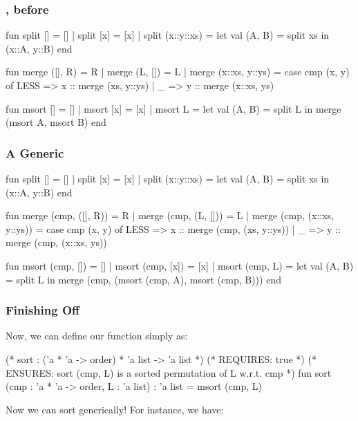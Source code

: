 \documentclass[aspectratio=169]{beamer}
\begin{document}
\begin{frame}[fragile]
  \frametitle{, before}
  {\tiny
  \begin{codeblock}
    fun split [] = []
      | split [x] = [x]
      | split (x::y::xs) = 
          let
            val (A, B) = split xs
          in
            (x::A, y::B)
          end

    fun merge ([], R) = R
      | merge (L, []) = L
      | merge (x::xs, y::ys) =
          case cmp (x, y) of
            LESS => x :: merge (xs, y::ys)
          | _ => y :: merge (x::xs, ys)

    fun msort [] = []
      | msort [x] = [x]
      | msort L = 
          let
            val (A, B) = split L 
          in
            merge (msort A, msort B) 
          end
  \end{codeblock}
  }
\end{frame}


\begin{frame}[fragile]
  \frametitle{A Generic }
  {\tiny
  \begin{codeblock}
    fun split [] = []
      | split [x] = [x]
      | split (x::y::xs) = 
          let
            val (A, B) = split xs
          in
            (x::A, y::B)
          end

    fun merge (cmp, ([], R)) = R
      | merge (cmp, (L, [])) = L
      | merge (cmp, (x::xs, y::ys)) =
          case cmp (x, y) of
            LESS => x :: merge (cmp, (xs, y::ys))
          | _ => y :: merge (cmp, (x::xs, ys))

    fun msort (cmp, []) = []
      | msort (cmp, [x]) = [x]
      | msort (cmp, L) = 
          let
            val (A, B) = split L 
          in
            merge (cmp, (msort (cmp, A), msort (cmp, B))) 
          end
  \end{codeblock}
  }
\end{frame}

\begin{frame}[fragile]
  \frametitle{Finishing Off }

  Now, we can define our  function simply as:

  \begin{codeblock}
    (* sort : ('a * 'a -> order) * 'a list -> 'a list *)
    (* REQUIRES: true *)
    (* ENSURES: sort (cmp, L) is a sorted permutation of L w.r.t. cmp *)
    fun sort (cmp : 'a * 'a -> order, L : 'a list) : 'a list = msort (cmp, L) 
  \end{codeblock}

  Now we can sort generically! For instance, we have:
\end{frame}
\end{document}
